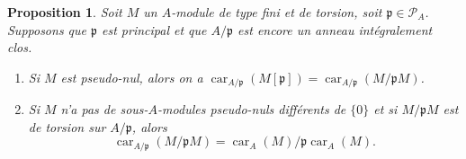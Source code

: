 \documentclass[12pt]{amsart}
\newcommand\cP{\mathcal{P}}
\newcommand\gp{\mathfrak{p}}
\DeclareMathOperator{\car}{car}
\theoremstyle{defstyle}
\theoremstyle{thmstyle}
\newtheorem{proposition}[subsubsection]{Proposition}
\begin{document}
\begin{proposition}\label{prop_pseudo}
	Soit $M$ un $A$-module de type fini et de torsion, soit $\gp \in \cP_A$. Supposons que $\gp$ est principal et que $A/\gp$ est encore un anneau intégralement clos. 
	\begin{enumerate}
		\item Si $M$ est pseudo-nul, alors on a $\car_{A/\gp}(M[\gp])=\car_{A/\gp}(M/\gp M)$.
		\item Si $M$ n'a pas de sous-$A$-modules pseudo-nuls différents de $\{0\}$ et si $M /\gp M$ est de torsion sur $A/\gp$, alors $$\car_{A/\gp}(M/\gp M)= \car_A(M)/\gp \car_A(M).$$
	\end{enumerate}
\end{proposition}
\end{document}
